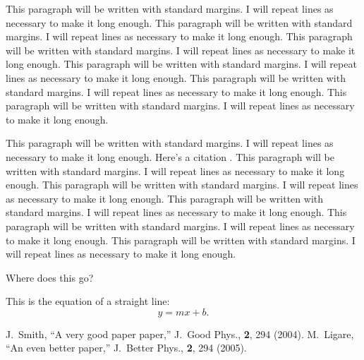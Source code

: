 \documentclass[numbib]{buthesis}  %
\begin{document}
This paragraph will be written with standard margins. I will repeat
lines as necessary to make it long enough. This paragraph will be
written with standard margins. I will repeat lines as necessary to
make it long enough. This paragraph will be written with standard
margins. I will repeat lines as necessary to make it long enough.
This paragraph will be written with standard margins. I will repeat
lines as necessary to make it long enough. This paragraph will be
written with standard margins. I will repeat lines as necessary to
make it long enough. This paragraph will be written with standard
margins. I will repeat lines as necessary to make it long enough.


This paragraph will be written with standard margins. I will repeat
lines as necessary to make it long enough. Here's a citation \citep{LIG05}.
This paragraph will be
written with standard margins. I will repeat lines as necessary to
make it long enough. This paragraph will be written with standard
margins. I will repeat lines as necessary to make it long enough. This
paragraph will be written with standard margins. I will repeat lines
as necessary to make it long enough. This paragraph will be written
with standard margins. I will repeat lines as necessary to make it
long enough. This paragraph will be written with standard margins. I
will repeat lines as necessary to make it long enough.

Where does this go?

This is the equation of a straight line:
\begin{equation}
y = mx + b.
\end{equation}

\backmatter

%


\begin{thebibliography}{99}
J.~Smith, ``A very good paper paper,''  
J.~Good Phys., {\bf 2}, 294 (2004).
M.~Ligare, ``An even better paper,''
J.~Better Phys., {\bf 2}, 294 (2005).
\end{thebibliography}
\end{document}
